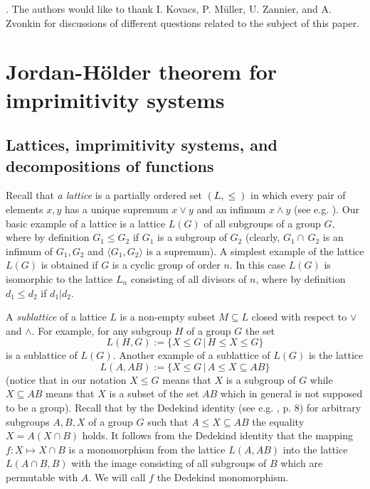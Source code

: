 \documentclass{amsart}
\begin{document}
\vskip 0.2cm
. The authors would
like to thank I. Kovacs, P. M\"uller, U. Zannier, and A. Zvonkin for discussions of different questions
related to the subject of this paper.

\section{Jordan-H\"older theorem for imprimitivity systems}
\subsection{Lattices, imprimitivity systems, and decompositions of functions}

Recall that {\it a lattice} is a partially ordered set {\textcolor{black}{{ $(L,\leq)$ }}}in which every pair of elements $x,y$
has a unique supremum $x\vee y$ and an infimum $x\wedge y$ (see e.g. \cite{ai}).
Our basic example of a lattice is a lattice $L(G)$ of all subgroups of a group $G,$ where
by definition $G_1\leq G_2$ if $G_1$ is a subgroup of $G_2$ (clearly, $G_1\cap\, G_2$ is an infimum of $G_1,G_2$ and
$\langle G_1,G_2\rangle$ is a supremum). A simplest example of the lattice $L(G)$ is obtained if
$G$ is a cyclic group of order $n$. In this case $L(G)$ is isomorphic
to the lattice $L_n$ consisting of
all divisors of $n$, where by definition $d_1\leq d_2$ if $d_1\vert d_2.$

A {\it sublattice} of a lattice $L$ is a non-empty subset $M\subseteq L$
closed with respect to $\vee$ and $\wedge$. For example, for any subgroup $H$ of a group $G$
the set $$L(H,G):=\{X\leq G\,|\,H\leq X\leq G\}$$ is a sublattice of $L(G)$.
Another example of a sublattice of $L(G)$ is the lattice $$L(A,AB):=\{X\leq G\,|\, A\leq X\subseteq AB\}$$
(notice that in our notation $X\leq G$ means that $X$ is a subgroup of
$G$ while $X\subseteq AB$ means that $X$ is a subset of the set $AB$ which in general is not supposed to be a group). Recall that by the Dedekind identity (see e.g. \cite{huppert}, p. 8)
for arbitrary subgroups $A,B,X$ of a group $G$ such that $A\leq X\subseteq AB$
the equality $X=A(X\cap B)$ holds. It follows from the Dedekind identity that the mapping $f:X\mapsto X\cap B$
is a monomorphism from the lattice $L(A,AB)$ into
the lattice $L(A\cap B,B)$ with the image consisting of all subgroups of $B$ which are permutable
with $A$. We will call $f$ the Dedekind monomorphism.
\end{document}
